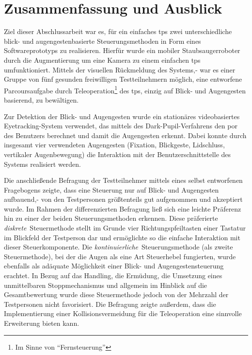 \chapter{Zusammenfassung und Ausblick}
\label{chapter:zusammenfassung}

Ziel dieser Abschlussarbeit war es, für ein einfaches \acl{tps} zwei unterschiedliche blick- und augengestenbasierte Steuerungsmethoden in Form eines Softwareprototyps zu realisieren. Hierfür wurde ein mobiler Staubsaugerroboter durch die Augmentierung um eine Kamera zu einem einfachen \acl{tps} umfunktioniert. Mittels der visuellen Rückmeldung des Systems,- war es einer Gruppe von fünf gesunden freiwilligen Testteilnehmern möglich, eine entworfene Parcoursaufgabe durch Teleoperation\footnote{Im Sinne von \enquote{Fernsteuerung}} des \acs{tps}, einzig auf Blick- und Augengesten basierend, zu bewältigen. 

Zur Detektion der Blick- und Augengesten wurde ein stationäres videobasiertes Eye\-track\-ing-System verwendet, das mittels des Dark-Pupil-Verfahrens den \acl{por} des Benutzers berechnet und damit die Augengesten erkennt. Dabei konnte durch insgesamt vier verwendeten Augengesten (Fixation, Blickgeste, Lidschluss, vertikaler Augenbewegung) die Interaktion mit der Benutzerschnittstelle des Systems realisiert werden. 

Die anschließende Befragung der Testteilnehmer mittels eines selbst entworfenen Fragebogens zeigte, dass eine Steuerung nur auf Blick- und Augengesten aufbauend,- von den Testpersonen größtenteils gut aufgenommen und akzeptiert wurde. Im Rahmen der differenzierten Befragung ließ sich eine leichte Präferenz hin zu einer der beiden Steuerungsmethoden erkennen. Diese präferierte \textit{diskrete}~Steuermethode stellt im Grunde vier Richtungspfeiltasten einer Tastatur im Blickfeld der Testperson dar und ermöglichte so die einfache Interaktion mit dieser Steuerkomponente. Die \textit{kontinuierliche}~Steuerungsmethode (als zweite Steuermethode), bei der die Augen als eine Art Steuerhebel fungierten, wurde ebenfalls als adäquate Möglichkeit einer Blick- und Augengestensteuerung erachtet. In Bezug auf das Handling, die Ermüdung, die Umsetzung eines unmittelbaren Stoppmechanismus und allgemein im Hinblick auf die Gesamtbewertung wurde diese Steuermethode jedoch von der Mehrzahl der Testpersonen nicht favorisiert. Die Befragung zeigte außerdem, dass die Implementierung einer Kollisionsvermeidung für die Teleoperation eine sinnvolle Erweiterung bieten kann. 

